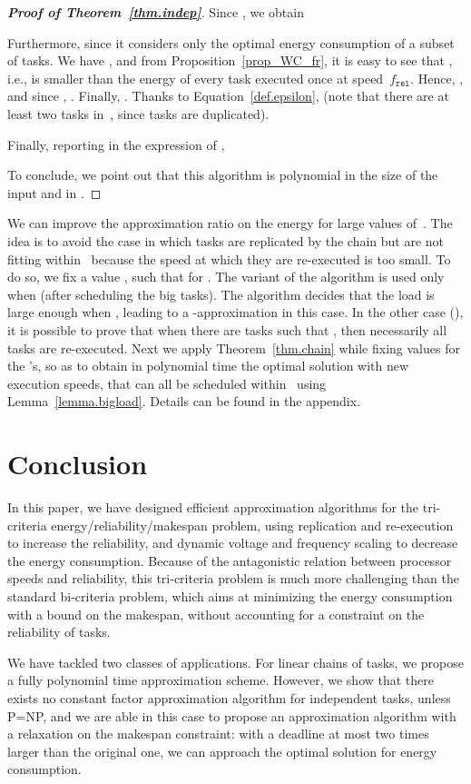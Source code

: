 \documentclass[a4paper]{article}
\theoremstyle{plain}
\theoremstyle{definition}
\theoremstyle{remark}
\newcommand{\fr}{\ensuremath{f_{\texttt{rel}}}\xspace}
\begin{document}
\begin{proof}[{\bf Proof of Theorem~\ref{thm.indep}}]
Since , we obtain


Furthermore,  since it considers only the
optimal energy consumption of a subset of tasks. We have , and from
Proposition~\ref{prop_WC_fr}, it is easy to see that 
, i.e.,  is smaller than
the energy of every task executed once at speed~\fr. Hence, , 
and since , . Finally, 
. 
Thanks to Equation~\eqref{def.epsilon}, 
 (note that there are at
least two tasks in~, since tasks are duplicated). 

Finally, reporting in the expression of ,  


\medskip
To conclude, we point out that this algorithm is polynomial in the
size of the input and in . 
\end{proof}

We can improve the approximation ratio on the energy for large values
of~. The idea is to avoid the case in which tasks are replicated by the
chain but are not fitting within~ because the speed at which
they are re-executed is too small. To do so, we fix a value
, such that
 for . The variant of the algorithm is
used only when  (after scheduling the big tasks). 
The algorithm decides that the load is large enough when , leading to a
-approximation in this case. In the other
case (), it is possible to
prove that when there are tasks such that
, then necessarily all tasks are
re-executed. Next we apply Theorem~\ref{thm.chain} while fixing values
for the 's, so as to obtain in polynomial time the optimal
solution with new execution speeds, that can all be scheduled
within~ using Lemma~\ref{lemma.bigload}.  Details can be
found in the appendix.


\section{Conclusion}
\label{sec.conclusion}
In this paper, we have designed efficient approximation algorithms for
the tri-criteria energy/reliability/make\-span problem, using
replication and re-execution to increase the reliability, and dynamic
voltage and frequen\-cy scaling to decrease the energy consumption.
Because of the antagonistic relation between processor speeds and
reliability, this tri-criteria problem is much more challenging than
the standard bi-criteria problem, which aims at minimizing the energy
consumption with a bound on the makespan, without accounting for a
constraint on the reliability of tasks.

We have tackled two classes of applications. For linear chains of
tasks, we propose a fully polynomial time approximation scheme.
However, we show that there exists no constant factor approximation
algorithm for independent tasks, unless P=NP, and we are able in this
case to propose an approximation algorithm with a relaxation on the
makespan constraint: with a deadline at most two times larger than the
original one, we can approach the optimal solution for energy
consumption. 
\end{document}
